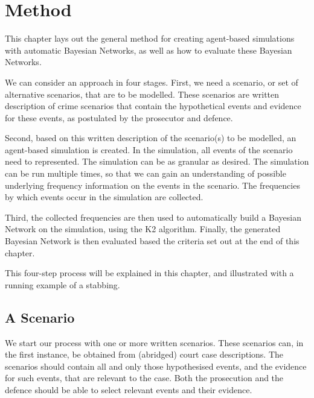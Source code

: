  

\chapter[Method]{Method}



This chapter lays out the general method for creating agent-based simulations with automatic Bayesian Networks, as well as how to evaluate these Bayesian Networks.

We can consider an approach in four stages. First, we need a scenario, or set of alternative scenarios, that are to be modelled. These scenarios are written description of crime scenarios that contain the hypothetical events and evidence for these events, as postulated by the prosecutor and defence. 

Second, based on this written description of the scenario(s) to be modelled, an agent-based simulation is created. In the simulation, all events of the scenario need to represented. The simulation can be as granular as desired. The simulation can be run multiple times, so that we can gain an understanding of possible underlying frequency information on the events in the scenario. The frequencies by which events occur in the simulation are collected.

Third, the collected frequencies are then used to automatically build a Bayesian Network on the simulation, using the K2 algorithm. Finally, the generated Bayesian Network is then evaluated based the criteria set out at the end of this chapter.

This four-step process will be explained in this chapter, and illustrated with a running example of a stabbing.



\section{A Scenario}
We start our process with one or more written scenarios. These scenarios can, in the first instance, be obtained from (abridged) court case descriptions. The scenarios should contain all and only those hypothesised events, and the evidence for such events, that are relevant to the case. Both the prosecution and the defence should be able to select relevant events and their evidence. 


